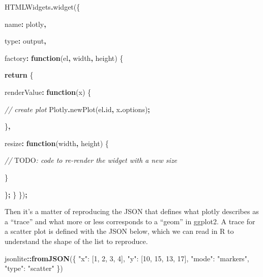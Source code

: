 \documentclass[
]{krantz}
\makeatletter
\newenvironment{Shaded}{\begin{snugshade}}{\end{snugshade}}
\newcommand{\AlertTok}[1]{\textcolor[rgb]{0.33,0.33,0.33}{#1}}
\newcommand{\AttributeTok}[1]{\textcolor[rgb]{0.61,0.61,0.61}{#1}}
\newcommand{\CommentTok}[1]{\textcolor[rgb]{0.37,0.37,0.37}{\textit{#1}}}
\newcommand{\ControlFlowTok}[1]{\textcolor[rgb]{0.27,0.27,0.27}{\textbf{#1}}}
\newcommand{\DataTypeTok}[1]{\textcolor[rgb]{0.27,0.27,0.27}{#1}}
\newcommand{\FunctionTok}[1]{\textcolor[rgb]{0,0,0}{#1}}
\newcommand{\KeywordTok}[1]{\textcolor[rgb]{0.27,0.27,0.27}{\textbf{#1}}}
\newcommand{\NormalTok}[1]{#1}
\newcommand{\OperatorTok}[1]{\textcolor[rgb]{0.43,0.43,0.43}{\textbf{#1}}}
\newcommand{\StringTok}[1]{\textcolor[rgb]{0.5,0.5,0.5}{#1}}
\newenvironment{kframe}{%
\medskip{}
\setlength{\fboxsep}{.8em}
 \def\at@end@of@kframe{}%
 \ifinner\ifhmode%
  \def\at@end@of@kframe{\end{minipage}}%
  \begin{minipage}{\columnwidth}%
 \fi\fi%
 \def\FrameCommand##1{\hskip\@totalleftmargin \hskip-\fboxsep
 \colorbox{shadecolor}{##1}\hskip-\fboxsep
     \hskip-\linewidth \hskip-\@totalleftmargin \hskip\columnwidth}%
 \MakeFramed {\advance\hsize-\width
   \@totalleftmargin\z@ \linewidth\hsize
   \@setminipage}}%
 {\par\unskip\endMakeFramed%
 \at@end@of@kframe}
\renewenvironment{Shaded}{\begin{kframe}}{\end{kframe}}
\makeatother
\begin{document}
\begin{Shaded}
\begin{Highlighting}[]
\NormalTok{HTMLWidgets}\OperatorTok{.}\FunctionTok{widget}\NormalTok{(\{}

  \DataTypeTok{name}\OperatorTok{:} \StringTok{\textquotesingle{}plotly\textquotesingle{}}\OperatorTok{,}

  \DataTypeTok{type}\OperatorTok{:} \StringTok{\textquotesingle{}output\textquotesingle{}}\OperatorTok{,}

  \DataTypeTok{factory}\OperatorTok{:} \KeywordTok{function}\NormalTok{(el}\OperatorTok{,}\NormalTok{ width}\OperatorTok{,}\NormalTok{ height) \{}

    \ControlFlowTok{return}\NormalTok{ \{}

      \DataTypeTok{renderValue}\OperatorTok{:} \KeywordTok{function}\NormalTok{(x) \{}

        \CommentTok{// create plot}
\NormalTok{        Plotly}\OperatorTok{.}\FunctionTok{newPlot}\NormalTok{(el}\OperatorTok{.}\AttributeTok{id}\OperatorTok{,}\NormalTok{ x}\OperatorTok{.}\AttributeTok{options}\NormalTok{)}\OperatorTok{;}

\NormalTok{      \}}\OperatorTok{,}

      \DataTypeTok{resize}\OperatorTok{:} \KeywordTok{function}\NormalTok{(width}\OperatorTok{,}\NormalTok{ height) \{}

        \CommentTok{// }\AlertTok{TODO}\CommentTok{: code to re{-}render the widget with a new size}

\NormalTok{      \}}

\NormalTok{    \}}\OperatorTok{;}
\NormalTok{  \}}
\NormalTok{\})}\OperatorTok{;}
\end{Highlighting}
\end{Shaded}

Then it's a matter of reproducing the JSON that defines what plotly describes as a ``trace'' and what more or less corresponds to a ``geom'' in ggplot2. A trace for a scatter plot is defined with the JSON below, which we can read in R to understand the shape of the list to reproduce.

\begin{Shaded}
\begin{Highlighting}[]
\NormalTok{jsonlite}\OperatorTok{::}\KeywordTok{fromJSON}\NormalTok{(}\StringTok{\textquotesingle{}\{}
\StringTok{	"x": [1, 2, 3, 4],}
\StringTok{	"y": [10, 15, 13, 17],}
\StringTok{	"mode": "markers",}
\StringTok{	"type": "scatter"}
\StringTok{\}\textquotesingle{}}\NormalTok{)}
\end{Highlighting}
\end{Shaded}
\end{document}
